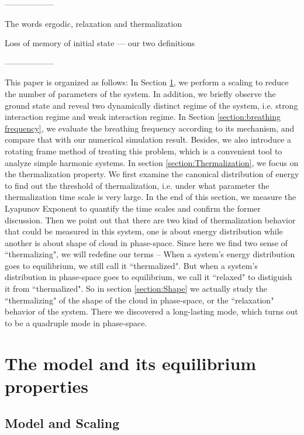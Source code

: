 \documentclass[onecolumn,pra]{revtex4-1}
\begin{document}
------------------

The words ergodic, relaxation and thermalization 

Loss of memory of initial state --- our two definitions 

------------------


This paper is organized as follows: In Section \ref{section:preparation}, we perform a scaling to
reduce the number of parameters of the system. In addition, we briefly observe the ground state and
reveal two dynamically distinct regime of the system, i.e. strong interaction regime and weak
interaction regime. In Section \ref{section:breathing frequency}, we evaluate the breathing
frequency according to its mechanism, and compare that with our numerical simulation
result. Besides, we also introduce a rotating frame method of treating this problem, which is a
convenient tool to analyze simple harmonic systems. In section \ref{section:Thermalization}, we
focus on the thermalization property. We first examine the canonical distribution of energy to find
out the threshold of thermalization, i.e. under what parameter the thermalization time scale is very
large. In the end of this section, we measure the Lyapunov Exponent to quantify the time scales and
confirm the former discussion. Then we point out that there are two kind of thermalization behavior
that could be measured in this system, one is about energy distribution while another is about shape
of cloud in phase-space. Since here we find two sense of ``thermalizing", we will redefine our terms
-- When a system's energy distribution goes to equilibrium, we still call it ``thermalized".  But
when a system's distribution in phase-space goes to equilibrium, we call it ``relaxed" to distiguish
it from ``thermalized". So in section \ref{section:Shape} we actually study the ``thermalizing" of
the shape of the cloud in phase-space, or the ``relaxation" behavior of the system. There we
discovered a long-lasting mode, which turns out to be a quadruple mode in phase-space.




\section{The model and its equilibrium properties}\label{section:preparation}

\subsection{Model and Scaling}
\end{document}
